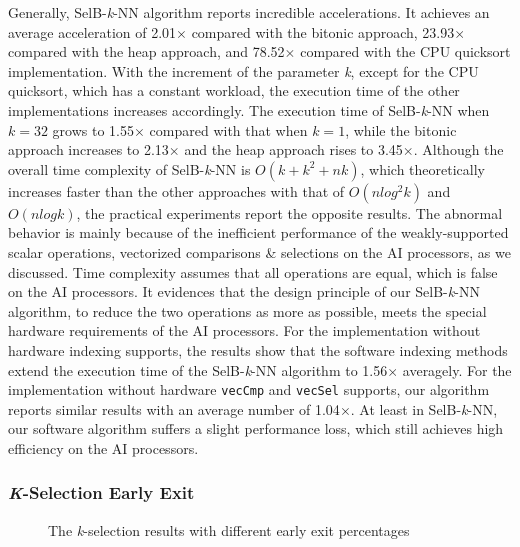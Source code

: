 \documentclass[12pt]{extbook}
\begin{document}
Generally, SelB-\textit{k}-NN algorithm reports incredible accelerations. It achieves an average acceleration of 2.01$\times$ compared with the bitonic approach, 23.93$\times$ compared with the heap approach, and 78.52$\times$ compared with the CPU quicksort implementation. With the increment of the parameter \textit{k}, except for the CPU quicksort, which has a constant workload, the execution time of the other implementations increases accordingly. The execution time of SelB-\textit{k}-NN when $k = 32$ grows to 1.55$\times$ compared with that when $k = 1$, while the bitonic approach increases to 2.13$\times$ and the heap approach rises to 3.45$\times$. Although the overall time complexity of SelB-\textit{k}-NN is $O(k + k^2 + nk)$, which theoretically increases faster than the other approaches with that of $O(nlog^2k)$ and $O(nlogk)$, the practical experiments report the opposite results. The abnormal behavior is mainly because of the inefficient performance of the weakly-supported scalar operations, vectorized comparisons \& selections on the AI processors, as we discussed. Time complexity assumes that all operations are equal, which is false on the AI processors. It evidences that the design principle of our SelB-\textit{k}-NN algorithm, to reduce the two operations as more as possible, meets the special hardware requirements of the AI processors. For the implementation without hardware indexing supports, the results show that the software indexing methods extend the execution time of the SelB-\textit{k}-NN algorithm to 1.56$\times$ averagely. For the implementation without hardware \verb|vecCmp| and \verb|vecSel| supports, our algorithm reports similar results with an average number of 1.04$\times$. At least in SelB-\textit{k}-NN, our software algorithm suffers a slight performance loss, which still achieves high efficiency on the AI processors.

\subsubsection{\textit{K}-Selection Early Exit \label{early}}

\begin{figure}[tbp]
    \caption{The \textit{k}-selection results with different early exit percentages}
    \label{fig:early_exit}
    \end{figure}
\end{document}
